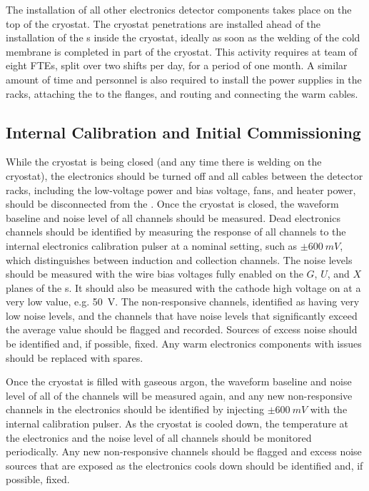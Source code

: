 The installation of all other  electronics detector components
takes place on the top of the cryostat. The cryostat penetrations are installed
ahead of the installation of the s inside the cryostat, ideally as
soon as the welding of the cold membrane is completed in part of the cryostat. 
This activity requires at team of eight FTEs, split over two shifts per day, for a 
period of one month. A similar amount of time and personnel is also required
to install the power supplies in the racks, attaching the  to
the  flanges, and routing and connecting the warm cables.

\subsection{Internal Calibration and Initial Commissioning}
\label{sec:fdsp-tpcelec-integration-calib}

While the cryostat is being closed (and any time there is welding 
on the cryostat), the electronics should be turned off and all 
cables between the detector racks, including the low-voltage power
and bias voltage, fans, and heater power, should be disconnected 
from the . Once the cryostat is closed, the waveform baseline 
and noise level of all channels should be measured. Dead electronics channels 
should be identified by measuring the response of all channels to 
the internal electronics calibration pulser at a nominal setting, 
such as $\pm\SI{600}{mV}$, which distinguishes between induction 
and collection channels. The noise levels should be measured with the wire bias 
voltages fully enabled on the $G$, $U$, and $X$ planes of the s. 
It should also be measured with the cathode high voltage on at a very 
low value, e.g. \SI{50}{V}. The non-responsive channels, identified
as having very low noise levels, and the channels that have noise levels that 
significantly exceed the average value should be flagged and recorded.
Sources of excess noise should be identified
and, if possible, fixed. Any warm electronics components with
issues should be replaced with spares.

Once the cryostat is filled with gaseous 
argon, the waveform baseline and noise level of all of the channels will be measured
again, and any new non-responsive channels in the electronics 
should be identified by injecting $\pm\SI{600}{mV}$ with the 
internal calibration pulser. As the cryostat is cooled down, the 
temperature at the electronics and the noise level of all channels should 
be monitored periodically. Any new non-responsive channels should 
be flagged and excess noise sources that are exposed as the 
electronics cools down should be identified and, if possible, fixed.

